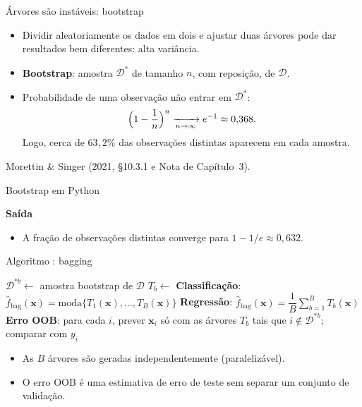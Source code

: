 \begin{frame}{Árvores são instáveis: bootstrap}
\begin{itemize}
  \item Dividir aleatoriamente os dados em dois e ajustar duas árvores pode dar resultados bem diferentes: \alert{alta variância}.
  \item \textbf{Bootstrap}: amostra $\mathcal D^{*}$ de tamanho $n$, \alert{com reposição}, de $\mathcal D$.
  \item Probabilidade de uma observação \alert{não} entrar em $\mathcal D^*$:
  \[
  \Bigl(1-\frac1n\Bigr)^n\xrightarrow[n\to\infty]{}e^{-1}\approx0{,}368 .
  \]
  Logo, cerca de $63{,}2\%$ das observações distintas aparecem em cada amostra.
\end{itemize}
{\footnotesize Morettin \& Singer (2021, \S10.3.1 e Nota de Capítulo~3).}
\end{frame}

\begin{frame}[fragile]{Bootstrap em Python}

\vspace{4pt}
{\footnotesize\textbf{Saída}}

\vspace{2pt}
\begin{itemize}
  \item A fração de observações distintas converge para $1-1/e\approx0{,}632$.
\end{itemize}
\end{frame}

\begin{frame}[t]{Algoritmo \aBag: bagging}
\small
\begin{algorithmic}[1]
  \State $\mathcal D^{*b}\gets$ amostra bootstrap de $\mathcal D$ 
  \State $T_b\gets$  
\EndFor
\State \textbf{Classificação}: $\hat f_{\text{bag}}(\mathbf x)=\text{moda}\{T_1(\mathbf x),\dots,T_B(\mathbf x)\}$
\State \textbf{Regressão}: $\hat f_{\text{bag}}(\mathbf x)=\dfrac1B\sum_{b=1}^B T_b(\mathbf x)$
\Statex
\State \textbf{Erro OOB}: para cada $i$, prever $\mathbf x_i$ só com as árvores $T_b$ tais que $i\notin\mathcal D^{*b}$; comparar com $y_i$
\end{algorithmic}
\vspace{6pt}
\begin{itemize}
  \item As $B$ árvores são geradas \alert{independentemente} (paralelizável).
  \item O erro OOB é uma estimativa de erro de teste sem separar um conjunto de validação.
\end{itemize}
\end{frame}

